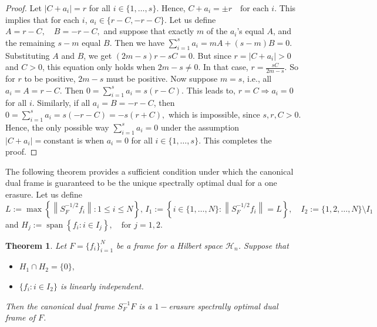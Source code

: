 \documentclass[final,1p,times]{elsarticle}
\newtheorem{thm}{Theorem}[section]
\begin{document}
 \begin{proof}
Let  \( |C + a_i| = r \) for all \( i \in \{1, \dots, s\} \).  Hence, $ C + a_i = \pm r \quad \text{for each } i.$ This implies that for each \( i \), \( a_i \in \{r - C, -r - C\} \). Let us define $A = r - C, \quad B = -r - C,$ and suppose that exactly \( m \) of the \( a_i \)'s equal \( A \), and the remaining \( s - m \) equal \( B \). Then we have $\sum_{i=1}^s a_i = mA + (s - m)B = 0.$
Substituting \( A \) and \( B \), we get $(2m - s)r - sC = 0.$ But since \( r = |C + a_i| > 0 \) and \( C > 0 \), this equation only holds when \( 2m - s \neq 0 \). In that case, $r = \frac{sC}{2m - s}.$ So for \( r \) to be positive, \( 2m - s \) must be positive. Now suppose \( m = s \), i.e., all \( a_i = A = r - C \). Then $0=\sum_{i=1}^s a_i = s(r - C).$
This leads to, \( r = C \Rightarrow a_i = 0 \) for all \( i \). Similarly, if all \( a_i = B = -r - C \), then $0=\sum_{i=1}^s a_i = s(-r - C) = -s(r + C),$ which is impossible, since $s,r,C>0.$ Hence, the only possible way \( \sum_{i=1}^s a_i = 0 \) under the assumption \( |C + a_i| = \text{constant} \) is when \( a_i = 0 \) for all \( i \in \{1, \dots, s\} \). This completes the proof.
\end{proof}




The following theorem provides a sufficient condition under which the canonical dual frame is guaranteed to be the unique spectrally optimal dual for a one erasure. Let us define $L := \max \left\{ \left\| S_F^{-1/2} f_i \right\| : 1 \leq i \leq N \right\},\,I_1 := \left\{ i \in \{1, \dots, N\} : \left\| S_F^{-1/2} f_i \right\| = L \right\}, \quad I_2 := \{1, 2, \dots, N\} \setminus I_1$ and $H_j := \operatorname{span} \left\{ f_i : i \in I_j \right\}, \quad \text{for } j = 1, 2.$

\begin{thm}\label{prop4point1}
Let \( F = \{f_i\}_{i=1}^N \) be a frame for a Hilbert space \( \mathcal{H}_n \). Suppose that
\begin{itemize}
    \item[(i)] \( H_1 \cap H_2 = \{0\}, \)
    \item[(ii)] \( \{ f_i : i \in I_2 \} \) is linearly independent.
\end{itemize}
Then the canonical dual frame \( S_F^{-1} F \) is a  $1-$erasure spectrally optimal dual frame of \( F \).
\end{thm}
\end{document}
